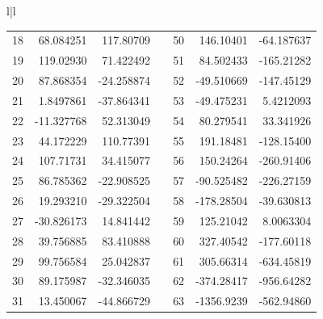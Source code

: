 \begin{table}[H]
{{{\begin{tabular}{l|l}
\begin{tabular}{crrccrr}
            18 &  68.084251 &  117.80709 & & 50 &  146.10401 & -64.187637 \\
            19 &  119.02930 &  71.422492 & & 51 &  84.502433 & -165.21282 \\
            20 &  87.868354 & -24.258874 & & 52 & -49.510669 & -147.45129 \\
            21 &  1.8497861 & -37.864341 & & 53 & -49.475231 &  5.4212093 \\
            22 & -11.327768 &  52.313049 & & 54 &  80.279541 &  33.341926 \\
            23 &  44.172229 &  110.77391 & & 55 &  191.18481 & -128.15400 \\
            24 &  107.71731 &  34.415077 & & 56 &  150.24264 & -260.91406 \\
            25 &  86.785362 & -22.908525 & & 57 & -90.525482 & -226.27159 \\
            26 &  19.293210 & -29.322504 & & 58 & -178.28504 & -39.630813 \\
            27 & -30.826173 &  14.841442 & & 59 &  125.21042 &  8.0063304 \\
            28 &  39.756885 &  83.410888 & & 60 &  327.40542 & -177.60118 \\
            29 &  99.756584 &  25.042837 & & 61 &  305.66314 & -634.45819 \\
            30 &  89.175987 & -32.346035 & & 62 & -374.28417 & -956.64282 \\
            31 &  13.450067 & -44.866729 & & 63 & -1356.9239 & -562.94860 \\
            \end{tabular}
        \end{tabular}
        }
    } }
    \label{table:08_03}
\end{table}